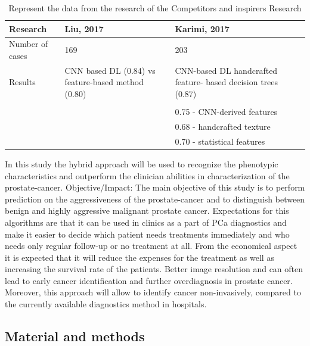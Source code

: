 \documentclass[11pt]{article}
\begin{document}
 \vspace{8mm}
 \begin{table}[H]
\begin{center}
\begin{tabular}{ |p{3cm}|p{5cm}|p{5cm}|   } 
\hline
{\bf Research} & {\bf Liu, 2017}  & {\bf Karimi, 2017}  \\ 
\hline
Number of cases&169&203 \\ 
\hline
Results&CNN based DL (0.84) vs feature-based method (0.80)&CNN-based DL handcrafted feature- based decision trees (0.87)  \\ 
 & & \\
 & & 0.75 - CNN-derived features \\
 & & 0.68 - handcrafted texture\\
 & & 0.70 - statistical features\\
 \hline
\end{tabular}
\caption{Represent the data from the research of the Competitors and inspirers Research}
\end{center}
\end{table}
 
 
 
 
 
 
 
 
 
 
 
 In this study the hybrid approach will be used to recognize the phenotypic characteristics and outperform   the clinician abilities in characterization of the prostate-cancer.
Objective/Impact: The main objective of this study is to perform prediction on the aggressiveness of the prostate-cancer and to distinguish between benign and highly aggressive malignant prostate cancer. Expectations for this algorithms are that it can be used in clinics as a part of PCa diagnostics and make it easier to decide which patient needs treatments immediately and who needs only regular follow-up or no treatment at all. 
From the economical aspect it is expected that it will reduce the expenses for the treatment as well as increasing the survival rate of the patients. Better image resolution and  can often lead to early cancer identification and further overdiagnosis in prostate cancer. Moreover, this approach will allow to identify cancer non-invasively, compared to the currently available diagnostics method in hospitals. 


\vspace{3mm}
\newpage
\subsection{Material and methods}
\end{document}
